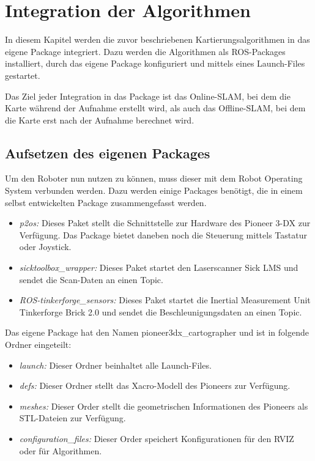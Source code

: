 \chapter{Integration der Algorithmen} \label{Kap4}

In diesem Kapitel werden die zuvor beschriebenen Kartierungsalgorithmen in das eigene Package integriert. Dazu werden die Algorithmen als ROS-Packages installiert, durch das eigene Package konfiguriert und mittels eines Launch-Files gestartet.

Das Ziel jeder Integration in das Package ist das Online-\ac{SLAM}, bei dem die Karte während der Aufnahme erstellt wird, als auch das Offline-\ac{SLAM}, bei dem die Karte erst nach der Aufnahme berechnet wird.

\section{Aufsetzen des eigenen Packages}

Um den Roboter nun nutzen zu können, muss dieser mit dem Robot Operating System verbunden werden. Dazu werden einige Packages benötigt, die in einem selbst entwickelten Package zusammengefasst werden.

\begin{itemize}
  \item \textit{p2os:} Dieses Paket stellt die Schnittstelle zur Hardware des Pioneer 3-DX zur Verfügung. Das Package bietet daneben noch die Steuerung mittels Tastatur oder Joystick.
  \item \textit{sicktoolbox\_wrapper:} Dieses Paket startet den Laserscanner Sick LMS und sendet die Scan-Daten an einen Topic.
  \item \textit{ROS-tinkerforge\_sensors:} Dieses Paket startet die Inertial Measurement Unit Tinkerforge Brick 2.0 und sendet die Beschleunigungsdaten an einen Topic.
\end{itemize}

Das eigene Package hat den Namen pioneer3dx\_cartographer und ist in folgende Ordner eingeteilt:

\begin{itemize}
  \item \textit{launch:} Dieser Ordner beinhaltet alle Launch-Files.
  \item \textit{defs:} Dieser Ordner stellt das Xacro-Modell des Pioneers zur Verfügung.
  \item \textit{meshes:} Dieser Order stellt die geometrischen Informationen des Pioneers als STL-Dateien zur Verfügung.
  \item \textit{configuration\_files:} Dieser Order speichert Konfigurationen für den RVIZ oder für Algorithmen.
\end{itemize}

